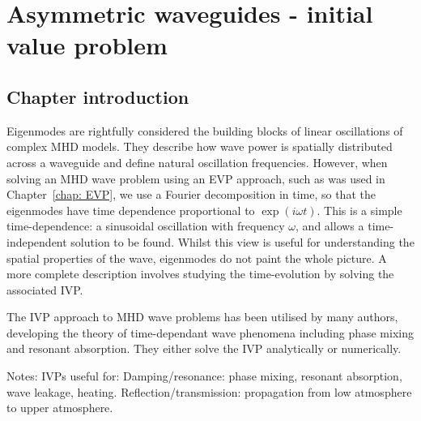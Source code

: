 \documentclass[12pt, draft]{../style-files/ociamthesis}
\begin{document}
\baselineskip=18pt

\setcounter{secnumdepth}{3}
\setcounter{tocdepth}{3}

\setcounter{chapter}{2}

\newcommand{\figdir}{../main/figures/chpt-3/} %

\newcommand{\bv}{\mathbf{v}}
\newcommand{\bB}{\mathbf{B}}

\chapter{Asymmetric waveguides - initial value problem}
\label{chap: IVP}

\section{Chapter introduction}
\label{sec: IVP intro}

Eigenmodes are rightfully considered the building blocks of linear oscillations of complex MHD models. They describe how wave power is spatially distributed across a waveguide and define natural oscillation frequencies. However, when solving an MHD wave problem using an EVP approach, such as was used in Chapter~\ref{chap: EVP}, we use a Fourier decomposition in time, so that the eigenmodes have time dependence proportional to $\exp(i\omega t)$. This is a simple time-dependence: a sinusoidal oscillation with frequency $\omega$, and allows a time-independent solution to be found. Whilst this view is useful for understanding the spatial properties of the wave, eigenmodes do not paint the whole picture. A more complete description involves studying the time-evolution by solving the associated IVP.

The IVP approach to MHD wave problems has been utilised by many authors, developing the theory of time-dependant wave phenomena including phase mixing and resonant absorption. They either solve the IVP analytically or numerically. 

\color{red}
Notes:
IVPs useful for:
Damping/resonance: phase mixing, resonant absorption, wave leakage, heating.
Reflection/transmission: propagation from low atmosphere to upper atmosphere.
\end{document}
